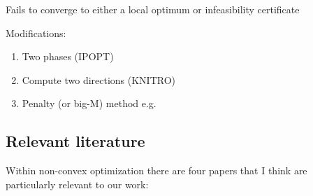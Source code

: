 \documentclass{article}
\begin{document}
Fails to converge to either a local optimum or infeasibility certificate

Modifications:
\begin{enumerate}
\item Two phases (IPOPT)
\item Compute two directions (KNITRO)
\item Penalty (or big-M) method e.g. \cite{Chen06,curtis2012penalty}
\end{enumerate}


\subsection{Relevant literature}

Within non-convex optimization there are four papers that I think are particularly relevant to our work:
\end{document}
